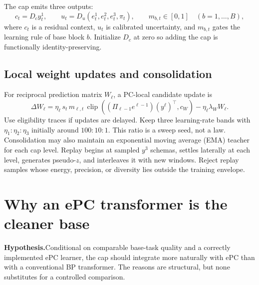 \documentclass[10pt]{article}
\newcommand{\hyp}{\textbf{Hypothesis.}}
\begin{document}
The cap emits three outputs:
\[
c_t=D_c y_t^1,\qquad
u_t=D_u(e_t^1,e_t^2,e_t^3,\pi_t),\qquad
m_{b,t}\in[0,1]\quad(b=1,\ldots,B),
\]
where $c_t$ is a residual context, $u_t$ is calibrated uncertainty, and $m_{b,t}$ gates the
learning rule of base block $b$.  Initialize $D_c$ at zero so adding the cap is functionally
identity-preserving.

\subsection{Local weight updates and consolidation}
For reciprocal prediction matrix $W_\ell$, a PC-local candidate update is
\[
\Delta W_\ell = \eta_\ell\,s_t\,m_{\ell,t}\,
\operatorname{clip}\!\left((\Pi_{\ell-1}e^{\ell-1})(y^\ell)^\top,c_W\right)
-\eta_\ell\lambda_W W_\ell .
\]
Use eligibility traces if updates are delayed.  Keep three learning-rate bands with
$\eta_1:\eta_2:\eta_3$ initially around $100:10:1$.  This ratio is a sweep seed, not a law.
Consolidation may also maintain an exponential moving average (EMA) teacher for each cap
level.  Replay begins at sampled $y^3$ schemas, settles laterally at each level, generates
pseudo-$z$, and interleaves it with new windows.  Reject replay samples whose energy,
precision, or diversity lies outside the training envelope.

\section{Why an ePC transformer is the cleaner base}
\hyp Conditional on comparable base-task quality and a correctly implemented ePC learner,
the cap should integrate more naturally with ePC than with a conventional BP transformer.
The reasons are structural, but none substitutes for a controlled comparison.
\end{document}
